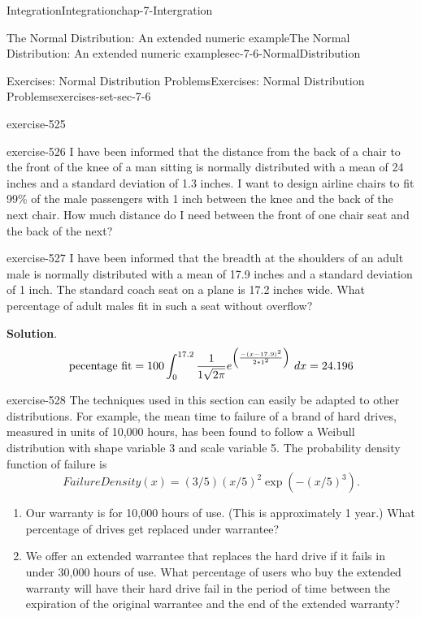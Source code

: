 \documentclass[oneside,10pt,]{book}
\numberwithin{equation}{section}
\begin{document}
\begin{chapterptx}{Integration}{}{Integration}{}{}{chap-7-Intergration}
\begin{sectionptx}{The Normal Distribution: An extended numeric example}{}{The Normal Distribution: An extended numeric example}{}{}{sec-7-6-NormalDistribution}
\begin{exercises-subsection-numberless}{Exercises: Normal Distribution Problems}{}{Exercises: Normal Distribution Problems}{}{}{exercises-set-sec-7-6}
\begin{divisionexercise}{9}{}{}{exercise-525}
\end{divisionexercise}%
\begin{divisionexercise}{10}{}{}{exercise-526}%
\hypertarget{p-2995}{}%
I have been informed that the distance from the back of a chair to the front of the knee of a man sitting is normally distributed with a mean of 24 inches and a standard deviation of 1.3 inches.  I want to design airline chairs to fit 99\% of the male passengers with 1 inch between the knee and the back of the next chair.  How much distance do I need between the front of one chair seat and the back of the next?%
\end{divisionexercise}%
\begin{divisionexercise}{11}{}{}{exercise-527}%
\hypertarget{p-2996}{}%
I have been informed that the breadth at the shoulders of an adult male is normally distributed with a mean of 17.9 inches and a standard deviation of 1 inch.  The standard coach seat on a plane is 17.2 inches wide.  What percentage of adult males fit in such a seat without overflow?%
\par\smallskip%
\noindent\textbf{Solution}.\hypertarget{solution-267}{}\quad%
%
\begin{equation*}
\hbox{pecentage fit}=100\int_{0}^{17.2}\frac{1}{1\sqrt{2\pi}} e^{\left({\frac{-(x-17.9)^2}{2*1^2}}\right)}\ dx =24.196
\end{equation*}
\end{divisionexercise}%
\begin{divisionexercise}{12}{}{}{exercise-528}%
\hypertarget{p-2997}{}%
The techniques used in this section can easily be adapted to other distributions.  For example, the mean time to failure of a brand of hard drives, measured in units of 10,000 hours, has been found to follow a Weibull distribution with shape variable 3 and scale variable 5.  The probability density function of failure is%
%
\begin{equation*}
FailureDensity(x)=(3/5) (x/5)^2 \exp(-(x/5)^3 ).
\end{equation*}
\leavevmode%
\begin{enumerate}[label=(\alph*)]
\item\hypertarget{li-792}{}\hypertarget{p-2998}{}%
Our warranty is for 10,000 hours of use.  (This is approximately 1 year.)  What percentage of drives get replaced under warrantee?%
\item\hypertarget{li-793}{}\hypertarget{p-2999}{}%
We offer an extended warrantee that replaces the hard drive if it fails in under 30,000 hours of use.  What percentage of users who buy the extended warranty will have their hard drive fail in the period of time between the expiration of the original warrantee and the end of the extended warranty?%

\end{enumerate}
\end{divisionexercise}
\end{exercises-subsection-numberless}
\end{sectionptx}
\end{chapterptx}
\end{document}

